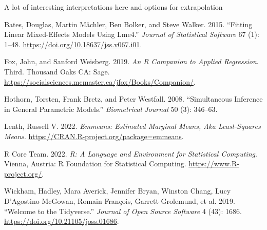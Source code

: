 \documentclass[
  letterpaper,
  DIV=11,
  numbers=noendperiod]{scrartcl}
\newlength{\cslhangindent}
\newlength{\cslentryspacingunit} %
\newenvironment{CSLReferences}[2] %
 {%
  \setlength{\parindent}{0pt}
  \ifodd #1
  \let\oldpar\par
  \def\par{\hangindent=\cslhangindent\oldpar}
  \fi
  \setlength{\parskip}{#2\cslentryspacingunit}
 }%
 {}
\begin{document}
A lot of interesting interpretations here and options for extrapolation

\hypertarget{refs}{}
\begin{CSLReferences}{1}{0}
\leavevmode{}%
Bates, Douglas, Martin Mächler, Ben Bolker, and Steve Walker. 2015.
{``Fitting {Linear} {Mixed}-{Effects} {Models} {Using} Lme4.''}
\emph{Journal of Statistical Software} 67 (1): 1--48.
\url{https://doi.org/10.18637/jss.v067.i01}.

\leavevmode{}%
Fox, John, and Sanford Weisberg. 2019. \emph{An {R} {Companion} to
{Applied} {Regression}}. Third. Thousand Oaks CA: Sage.
\url{https://socialsciences.mcmaster.ca/jfox/Books/Companion/}.

\leavevmode{}%
Hothorn, Torsten, Frank Bretz, and Peter Westfall. 2008. {``Simultaneous
{Inference} in {General} {Parametric} {Models}.''} \emph{Biometrical
Journal} 50 (3): 346--63.

\leavevmode{}%
Lenth, Russell V. 2022. \emph{Emmeans: {Estimated} {Marginal} {Means},
Aka {Least}-{Squares} {Means}}.
\url{https://CRAN.R-project.org/package=emmeans}.

\leavevmode{}%
R Core Team. 2022. \emph{R: A Language and Environment for Statistical
Computing}. Vienna, Austria: R Foundation for Statistical Computing.
\url{https://www.R-project.org/}.

\leavevmode{}%
Wickham, Hadley, Mara Averick, Jennifer Bryan, Winston Chang, Lucy
D'Agostino McGowan, Romain François, Garrett Grolemund, et al. 2019.
{``Welcome to the Tidyverse.''} \emph{Journal of Open Source Software} 4
(43): 1686. \url{https://doi.org/10.21105/joss.01686}.

\end{CSLReferences}
\end{document}
